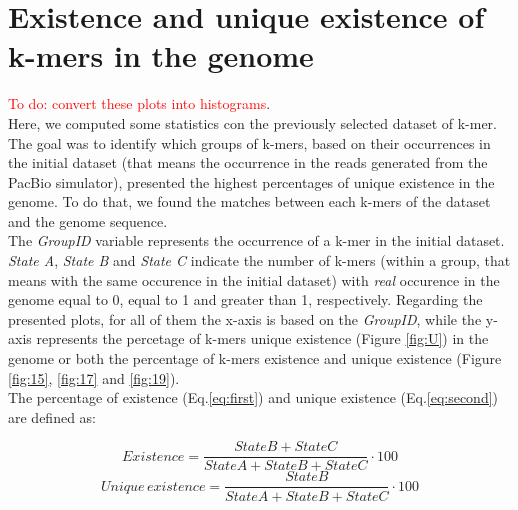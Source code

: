 \documentclass[11pt]{article}
\newcommand\myworries[1]{\textcolor{red}{#1}}
\begin{document}
\section{Existence and unique existence of k-mers in the genome}\label{existence}

\myworries{To do: convert these plots into histograms}.\\
Here, we computed some statistics con the previously selected dataset of k-mer.
The goal was to identify which groups of k-mers, based on their occurrences in the initial dataset (that means the occurrence in the reads generated from the PacBio simulator), presented the highest percentages of unique existence in the genome.
To do that, we found the matches between each k-mers of the dataset and the genome sequence.\\
The \emph{GroupID} variable represents the occurrence of a k-mer in the initial dataset. 
\emph{State A}, \emph{State B} and \emph{State C} indicate the number of k-mers (within a group, that means with the same occurence in the initial dataset) with \emph{real} occurence in the genome equal to 0, equal to 1 and greater than 1, respectively.
Regarding the presented plots, for all of them the x-axis is based on the \emph{GroupID}, while the y-axis represents the percetage of k-mers unique existence (Figure \ref{fig:U}) in the genome or both the percentage of k-mers existence and unique existence (Figure \ref{fig:15}, \ref{fig:17} and \ref{fig:19}).\\
The percentage of existence (Eq.\ref{eq:first}) and unique existence (Eq.\ref{eq:second}) are defined as:
\vspace{5mm}

\begin{equation}
Existence = \frac{State B + State C}{State A + State B + State C}\cdot 100
\label{eq:first}
\end{equation}
\begin{equation}
Unique\, existence = \frac{StateB}{StateA + StateB + StateC}\cdot 100
\label{eq:second}
\end{equation}
\end{document}
